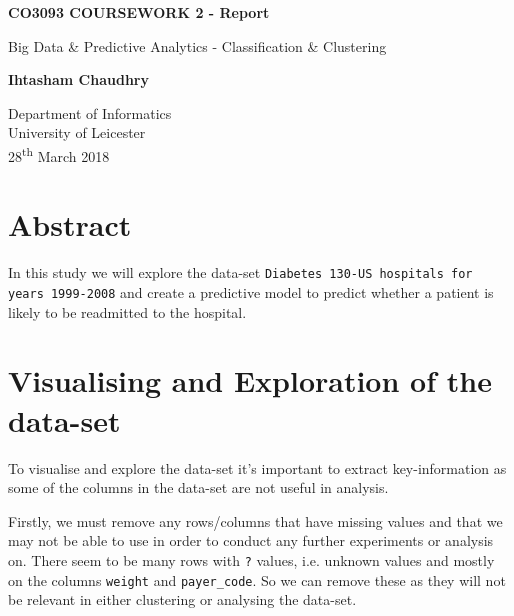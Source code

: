 \documentclass[11pt]{report}
\newcommand{\ts}{\textsuperscript}
\newcommand{\linespace}{\vspace{0.3cm}\noindent}
\begin{document}
\begin{titlepage}
    \begin{center}
        \vspace*{1cm}
        
        \textbf{CO3093 COURSEWORK 2 - Report}
        
        \vspace{0.5cm}
		Big Data \& Predictive Analytics - Classification \& Clustering
        
        \vspace{1.5cm}
        
        \textbf{Ihtasham Chaudhry}
        
        \vfill
        
        \vspace{0.8cm}
                
        Department of Informatics\\
        University of Leicester\\
        28\ts{th} March 2018
        
    \end{center}
\end{titlepage}

\newpage

\section{Abstract}

\linespace
In this study we will explore the data-set \texttt{Diabetes 130-US hospitals for years 1999-2008} and create a predictive model to predict whether a patient is likely to be readmitted to the hospital. 

\section{Visualising and Exploration of the data-set}

To visualise and explore the data-set it's important to extract key-information as some of the columns in the data-set are not useful in analysis.

\linespace
Firstly, we must remove any rows/columns that have missing values and that we may not be able to use in order to conduct any further experiments or analysis on. There seem to be many rows with \texttt{?} values, i.e. unknown values and mostly on the columns \texttt{weight} and \texttt{payer\_code}. So we can remove these as they will not be relevant in either clustering or analysing the data-set.
\end{document}
